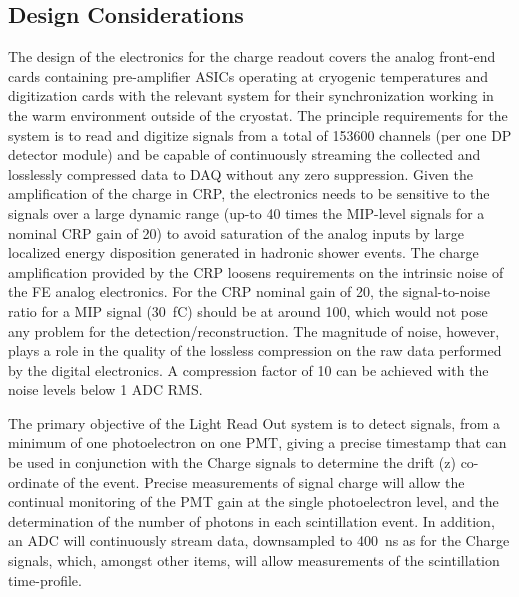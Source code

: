 \subsection{Design Considerations}
\label{sec:fddp-tpc-elec-des-consid}

The design of the electronics for the charge readout covers the analog front-end cards containing pre-amplifier ASICs operating at cryogenic temperatures and digitization cards with the relevant system for their synchronization working in the warm environment outside of the cryostat. The principle requirements for the system is to read and digitize signals from a total of \num{153600} channels (per one DP detector module) and be capable of continuously streaming the collected and losslessly compressed data to DAQ without any zero suppression. Given the amplification of the charge in CRP, the electronics needs to be sensitive to the signals over a large dynamic range (up-to \num{40} times the MIP-level signals for a nominal CRP gain of \num{20}) to avoid saturation of the analog inputs by large localized energy disposition generated in hadronic shower events. The charge amplification provided by the CRP loosens requirements on the intrinsic noise of the FE analog electronics. For the CRP nominal gain of \num{20}, the signal-to-noise ratio for a MIP signal (\SI{30}{fC}) should be at around \num{100}, which would not pose any problem for the detection/reconstruction. The magnitude of noise, however, plays a role in the quality of the lossless compression on the raw data performed by the digital electronics. A compression factor of \num{10} can be achieved with the noise levels below \num{1} ADC RMS.  %

The primary objective of the Light Read Out system is to detect signals, from a minimum of one photoelectron on one PMT, giving a precise timestamp that can be used in conjunction with the Charge signals to determine the drift (z) co-ordinate of the event.  Precise measurements of signal charge will allow the continual monitoring of the PMT gain at the single photoelectron level, and the determination of the number of photons in each scintillation event.  In addition, an ADC will continuously stream data, downsampled to \SI{400}{ns} as for the Charge signals,  which, amongst other items, will allow measurements of the scintillation time-profile. 


